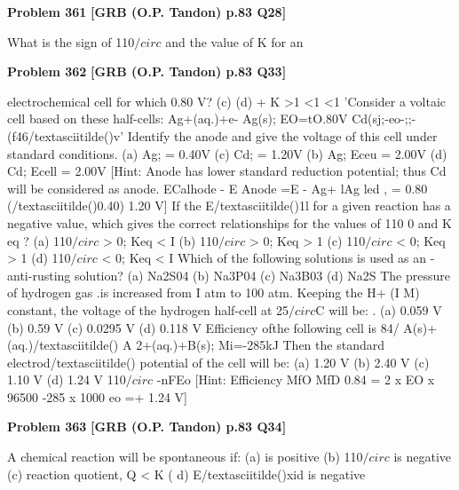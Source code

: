 \begin{problembox}
\textbf{Problem 361} \hfill \textbf{[GRB (O.P. Tandon) p.83 Q28]}
\label{q:ext-grb_all_questions-361}

What is the sign of 110$/circ$ and the value of K for an
\end{problembox}

\begin{problembox}
\textbf{Problem 362} \hfill \textbf{[GRB (O.P. Tandon) p.83 Q33]}
\label{q:ext-grb_all_questions-362}

electrochemical cell for which 
0.80 V? 
(c) 
(d) 
+ 
K 
>1 
<1 
<1 
'Consider a voltaic cell based on these half-cells: 
Ag+(aq.)+e-
Ag(s); EO=tO.80V 
Cd(sj;-eo-;;-(f46/textasciitilde()v' 
Identify the anode and give the voltage of this cell under 
standard conditions. 
(a) Ag; 
= 0.40V 
(c) Cd; 
= 1.20V 
(b) Ag; Eceu = 2.00V 
(d) Cd; Ecell = 2.00V 
[Hint: 
Anode has lower standard reduction potential; thus Cd 
will be considered as anode. 
ECalhode - E Anode 
=E 
-
Ag+ lAg 
led 
, 
= 0.80 
(/textasciitilde()0.40) 1.20 V] 
If the E/textasciitilde()1l for a given reaction has a negative value, which 
gives the correct relationships for the values of 110 0 and K eq ? 
(a) 110$/circ$ > 0; Keq < I 
(b) 110$/circ$ > 0; Keq > 1 
(c) 110$/circ$ < 0; Keq > 1 
(d) 110$/circ$ < 0; Keq < I 
Which of the following solutions is used as an -anti-rusting 
solution? 
(a) Na2S04 
(b) Na3P04 
(c) Na3B03 
(d) Na2S 
The \underline{\hspace{1cm}}pressure of hydrogen gas .is increased from I atm to 100 
atm. Keeping the H+ (I M) constant, the voltage of the 
hydrogen half-cell at 25$/circ$C will be: . 
(a) 0.059 V 
(b) 0.59 V 
(c) 0.0295 V (d) 0.118 V 
Efficiency ofthe following cell is 84/%
A(s)+ 
(aq.)/textasciitilde() A 2+(aq.)+B(s); Mi=-285kJ 
Then the standard electrod/textasciitilde() potential of the cell will be: 
(a) 1.20 V 
(b) 2.40 V 
(c) 1.10 V 
(d) 1.24 V 
110$/circ$ 
-nFEo 
[Hint: 
Efficiency 
MfO 
MfD 
0.84 = \underline{\hspace{1cm}} 2 x EO x 96500 
-285 x 1000 
eo =+ 1.24 V]
\end{problembox}

\begin{problembox}
\textbf{Problem 363} \hfill \textbf{[GRB (O.P. Tandon) p.83 Q34]}
\label{q:ext-grb_all_questions-363}

A chemical reaction will be spontaneous if: 
(a) 
is positive 
(b) 110$/circ$ is negative 
(c) reaction quotient, Q < K ( d) E/textasciitilde()xid is negative
\end{problembox}

